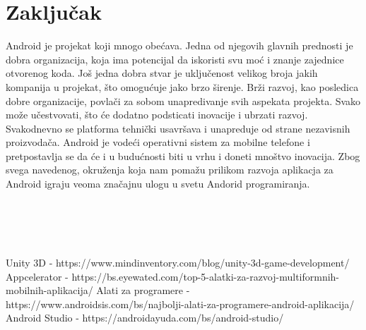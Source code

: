 \documentclass[12pt]{article}
\begin{document}
\section{Zaključak}

Android je projekat koji mnogo obećava. Jedna od njegovih glavnih prednosti je dobra organizacija,
koja ima potencijal da iskoristi svu moć i znanje zajednice otvorenog koda.
Još jedna dobra stvar je uključenost velikog broja jakih kompanija u projekat, što omogućuje jako brzo širenje.
Brži razvoj, kao posledica dobre organizacije, povlači za sobom unapredivanje svih aspekata projekta.
Svako može učestvovati, što će dodatno podsticati inovacije i ubrzati razvoj. 
Svakodnevno se platforma tehnički usavršava i unapreduje od strane nezavisnih proizvodača. 
Android je vodeći operativni sistem za mobilne telefone i pretpostavlja se da će i u budućnosti biti u vrhu i doneti
mnoštvo inovacija. Zbog svega navedenog, okruženja koja nam pomažu prilikom
razvoja aplikacja za Android igraju veoma značajnu ulogu u svetu Andorid programiranja.
\\\\\\\\\\

\begin{thebibliography}{}
Unity 3D - https://www.mindinventory.com/blog/unity-3d-game-development/
Appcelerator - https://bs.eyewated.com/top-5-alatki-za-razvoj-multiformnih-mobilnih-aplikacija/
Alati za programere - https://www.androidsis.com/bs/najbolji-alati-za-programere-android-aplikacija/
Android Studio - https://androidayuda.com/bs/android-studio/
\end{thebibliography}
\end{document}
